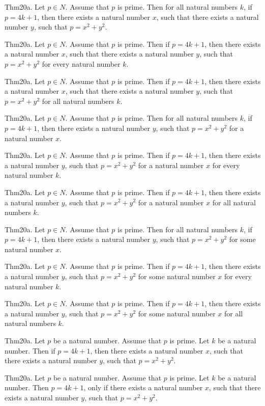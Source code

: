 \documentclass{article}
\begin{document}
Thm20a. Let $p \in N$. Assume that $p$ is prime. Then for all natural numbers $k$, if $p = 4 k + 1$, then there exists a natural number $x$, such that there exists a natural number $y$, such that $p = x ^{ 2}+ y ^{ 2}$.

Thm20a. Let $p \in N$. Assume that $p$ is prime. Then if $p = 4 k + 1$, then there exists a natural number $x$, such that there exists a natural number $y$, such that $p = x ^{ 2}+ y ^{ 2}$ for every natural number $k$.

Thm20a. Let $p \in N$. Assume that $p$ is prime. Then if $p = 4 k + 1$, then there exists a natural number $x$, such that there exists a natural number $y$, such that $p = x ^{ 2}+ y ^{ 2}$ for all natural numbers $k$.

Thm20a. Let $p \in N$. Assume that $p$ is prime. Then for all natural numbers $k$, if $p = 4 k + 1$, then there exists a natural number $y$, such that $p = x ^{ 2}+ y ^{ 2}$ for a natural number $x$.

Thm20a. Let $p \in N$. Assume that $p$ is prime. Then if $p = 4 k + 1$, then there exists a natural number $y$, such that $p = x ^{ 2}+ y ^{ 2}$ for a natural number $x$ for every natural number $k$.

Thm20a. Let $p \in N$. Assume that $p$ is prime. Then if $p = 4 k + 1$, then there exists a natural number $y$, such that $p = x ^{ 2}+ y ^{ 2}$ for a natural number $x$ for all natural numbers $k$.

Thm20a. Let $p \in N$. Assume that $p$ is prime. Then for all natural numbers $k$, if $p = 4 k + 1$, then there exists a natural number $y$, such that $p = x ^{ 2}+ y ^{ 2}$ for some natural number $x$.

Thm20a. Let $p \in N$. Assume that $p$ is prime. Then if $p = 4 k + 1$, then there exists a natural number $y$, such that $p = x ^{ 2}+ y ^{ 2}$ for some natural number $x$ for every natural number $k$.

Thm20a. Let $p \in N$. Assume that $p$ is prime. Then if $p = 4 k + 1$, then there exists a natural number $y$, such that $p = x ^{ 2}+ y ^{ 2}$ for some natural number $x$ for all natural numbers $k$.

Thm20a. Let $p$ be a natural number. Assume that $p$ is prime. Let $k$ be a natural number. Then if $p = 4 k + 1$, then there exists a natural number $x$, such that there exists a natural number $y$, such that $p = x ^{ 2}+ y ^{ 2}$.

Thm20a. Let $p$ be a natural number. Assume that $p$ is prime. Let $k$ be a natural number. Then $p = 4 k + 1$, only if there exists a natural number $x$, such that there exists a natural number $y$, such that $p = x ^{ 2}+ y ^{ 2}$.
\end{document}
